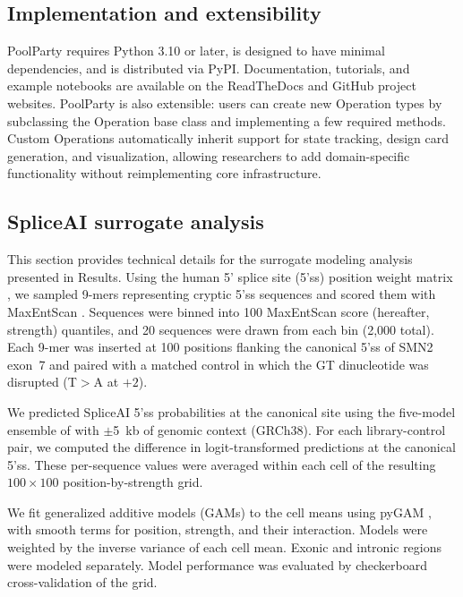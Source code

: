 \documentclass[pdflatex,sn-vancouver-num,referee,oneside]{sn-jnl}
\begin{document}
\subsection{Implementation and extensibility}\label{subsec:implementation-and-extensibility}

PoolParty requires Python 3.10 or later, is designed to have minimal dependencies, and is distributed via PyPI. Documentation, tutorials, and example notebooks are available on the ReadTheDocs and GitHub project websites. PoolParty is also extensible: users can create new Operation types by subclassing the Operation base class and implementing a few required methods. Custom Operations automatically inherit support for state tracking, design card generation, and visualization, allowing researchers to add domain-specific functionality without reimplementing core infrastructure.

\subsection{SpliceAI surrogate analysis}\label{subsec:spliceai-surrogate-analysis}

This section provides technical details for the surrogate modeling analysis presented in Results. Using the human 5' splice site (5'ss) position weight matrix \citep{Wong2018quantitative}, we sampled 9-mers representing cryptic 5'ss sequences and scored them with MaxEntScan \citep{Yeo2004me}. Sequences were binned into 100 MaxEntScan score (hereafter, strength) quantiles, and 20 sequences were drawn from each bin (2,000 total). Each 9-mer was inserted at 100 positions flanking the canonical 5'ss of SMN2 exon~7 and paired with a matched control in which the GT dinucleotide was disrupted (T$>$A at $+2$).

We predicted SpliceAI 5'ss probabilities at the canonical site using the five-model ensemble of \citet{Jaganathan2019ps} with $\pm$5~kb of genomic context (GRCh38). For each library-control pair, we computed the difference in logit-transformed predictions at the canonical 5'ss. These per-sequence values were averaged within each cell of the resulting $100 \times 100$ position-by-strength grid.

We fit generalized additive models (GAMs) to the cell means using pyGAM \citep{Serven2018pg}, with smooth terms for position, strength, and their interaction. Models were weighted by the inverse variance of each cell mean. Exonic and intronic regions were modeled separately. Model performance was evaluated by checkerboard cross-validation of the grid.
\end{document}
